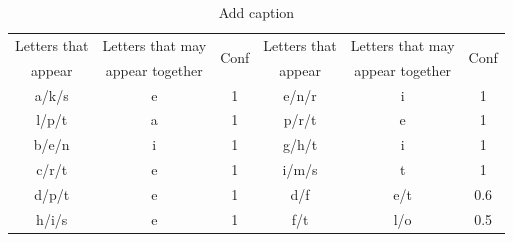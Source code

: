 \documentclass[12pt]{ctexart}
\begin{document}
\begin{table}[htbp]
    \centering  %
    \caption{Confidence Intervals}
    \label{tab:4}
\end{table}

\begin{table}[htbp]
	\centering
	\caption{Add caption}
	  \begin{tabular}{cccccc}
		\toprule
	  \rowcolor[rgb]{ .706,  .776,  .906} Letters that & Letters that may & \multirow{2}[0]{*}{Conf} & Letters that & Letters that may & \multirow{2}[0]{*}{Conf} \\
	  \rowcolor[rgb]{ .706,  .776,  .906} appear & appear together &       & appear & appear together &  \\
	 \midrule
	  a/k/s & e     & 1     & e/n/r & i     & 1 \\
	  l/p/t & a     & 1     & p/r/t & e     & 1 \\
	  b/e/n & i     & 1     & g/h/t & i     & 1 \\
	  c/r/t & e     & 1     & i/m/s & t     & 1 \\
	  d/p/t & e     & 1     & d/f   & e/t   & 0.6 \\
	  h/i/s & e     & 1     & f/t   & l/o   & 0.5 \\
	  \bottomrule
	  \end{tabular}%
	
	\label{tab:addlabel}%
  \end{table}%
  
  

  

\end{document}
